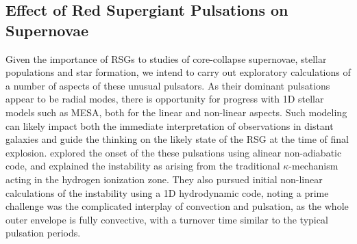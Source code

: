 \subsection{Effect of Red Supergiant Pulsations on Supernovae}

Given the importance of RSGs to studies of core-collapse supernovae, stellar populations and star formation, we intend to carry out exploratory calculations of a number of aspects of these unusual pulsators. As their dominant pulsations appear to be radial modes, there is opportunity for progress with 1D stellar models such as MESA, both for the linear and non-linear aspects. {\color{green} Such modeling can likely impact both the immediate interpretation of observations in distant galaxies and guide the thinking on the likely state of the RSG at the time of final explosion.} \citet{1997AampA...327..224H} explored the onset of the these pulsations using alinear non-adiabatic code, and explained the instability  as arising from the traditional $\kappa$-mechanism acting in the hydrogen ionization zone. They also pursued initial
non-linear calculations of the instability using a 1D hydrodynamic code, noting a prime challenge was the complicated interplay of convection and pulsation, as the whole outer envelope is fully convective, with a turnover time similar to the typical pulsation periods.